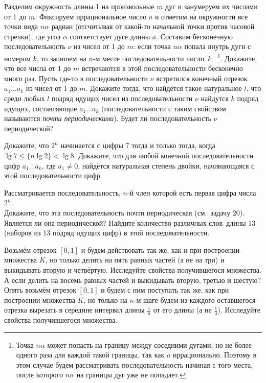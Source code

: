 \documentclass[a4paper, 11pt]{article}
\begin{document}
Разделим окружность длины 1 на произвольные $m$ дуг и занумеруем их
числами от 1 до $m$. Фиксируем иррациональное
число $a$ и отметим на окружности все точки вида $n\alpha$
радиан (отсчитывая от какой-то начальной точки
против часовой стрелки), где угол $\alpha$ соответствует дуге длины $a$.
Составим бесконечную последовательность $\nu$ из чисел от 1 до $m$:
если точка $n\alpha$ попала внутрь дуги с номером $k$, то запишем
на $n$-м месте последовательности число~$k$~%
\footnote{Точка $n\alpha$ может попасть на границу между соседними
дугами, но не более одного раза для каждой такой
границы, так как $a$ иррационально.
Поэтому в этом случае будем рассматривать последовательность
начиная с того места, после которого $n\alpha$ на границы
дуг уже не попадает.}.
Докажите, что все числа от 1 до $m$ встречаются
в этой последовательности бесконечно много раз.
Пусть где-то в последовательности $\nu$ встретился конечный
отрезок $\overline{a_1\dots a_k}$ из чисел от 1 до $m$.
Докажите тогда, что найдётся такое натуральное $l$,
что среди любых $l$ подряд идущих чисел из последовательности $\nu$
найдутся $k$ подряд идущих, составляющие $\overline{a_1\dots a_k}$
(последовательности с таким свойством
называются \emph{почти периодическими}).
Будет ли последовательность $\nu$ периодической?


Докажите, что $2^n$ начинается с цифры 7 тогда и только тогда, когда
$\lg7\leq\{n\lg2\}<\lg8$.
Докажите, что для любой конечной последовательности
цифр $\overline{a_1\dots a_k}$, где $a_1\ne0$,
найдётся натуральная степень двойки,
начинающаяся с этой последовательности цифр.

Рассматривается последовательность, $n$-й член которой есть
первая цифра числа $2^n$.\\
Докажите, что эта последовательность
почти периодическая (см.~задачу 20).
Является ли она периодической?
Найдите количество различных  слов\
длины 13 (наборов из 13 подряд идущих цифр) в этой последовательности.
\кзадача


Возьмём отрезок $[0,1]$ и будем действовать так же, как и при построении
множества $K$, но только делить на пять равных частей
(а не на три) и выкидывать
вторую и четвёртую. Исследуйте свойства получившегося множества.
А если делить на восемь равных частей и выкидывать вторую, третью и шестую?
\пункт
Опять возьмём отрезок $[0,1]$ и будем с ним поступать так же, как при построении
множества $K$, но только на $n$-м шаге будем из каждого оставшегося отрезка
вырезать в середине интервал длины $\frac1n$ от его длины (а не $\frac13$).
Исследуйте свойства получившегося множества.
\end{document}
